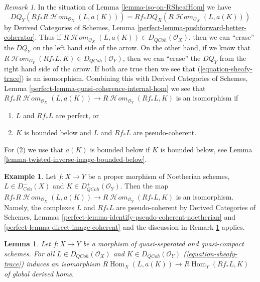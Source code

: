 \documentclass{stacks-project}
\theoremstyle{plain}
\newtheorem{lemma}[subsection]{Lemma}
\theoremstyle{definition}
\newtheorem{example}[subsection]{Example}
\theoremstyle{remark}
\newtheorem{remark}[subsection]{Remark}
\numberwithin{equation}{subsection}
\def\Hom{\mathop{\mathrm{Hom}}\nolimits}
\def\SheafHom{\mathop{\mathcal{H}\!\mathit{om}}\nolimits}
\def\QCoh{\mathit{QCoh}}
\begin{document}
\begin{remark}
\label{remark-iso-on-RSheafHom}
In the situation of Lemma \ref{lemma-iso-on-RSheafHom} we have
$$
DQ_Y(Rf_*R\SheafHom_{\mathcal{O}_X}(L, a(K))) =
Rf_* DQ_X(R\SheafHom_{\mathcal{O}_X}(L, a(K)))
$$
by Derived Categories of Schemes, Lemma
\ref{perfect-lemma-pushforward-better-coherator}.
Thus if $R\SheafHom_{\mathcal{O}_X}(L, a(K)) \in D_\QCoh(\mathcal{O}_X)$,
then we can ``erase'' the $DQ_Y$ on the left hand side of the arrow.
On the other hand, if we know that
$R\SheafHom_{\mathcal{O}_Y}(Rf_*L, K) \in D_\QCoh(\mathcal{O}_Y)$,
then we can ``erase'' the $DQ_Y$ from the right hand side of the arrow.
If both are true then we see that (\ref{equation-sheafy-trace})
is an isomorphism. Combining this with
Derived Categories of Schemes, Lemma
\ref{perfect-lemma-quasi-coherence-internal-hom}
we see that $Rf_*R\SheafHom_{\mathcal{O}_X}(L, a(K)) \to
R\SheafHom_{\mathcal{O}_Y}(Rf_*L, K)$ is an isomorphism if
\begin{enumerate}
\item $L$ and $Rf_*L$ are perfect, or
\item $K$ is bounded below and $L$ and $Rf_*L$ are pseudo-coherent.
\end{enumerate}
For (2) we use that $a(K)$ is bounded below if $K$
is bounded below, see Lemma \ref{lemma-twisted-inverse-image-bounded-below}.
\end{remark}

\begin{example}
\label{example-iso-on-RSheafHom-noetherian}
Let $f : X \to Y$ be a proper morphism of Noetherian schemes,
$L \in D^-_{\textit{Coh}}(X)$ and $K \in D^+_{\QCoh}(\mathcal{O}_Y)$.
Then the map $Rf_*R\SheafHom_{\mathcal{O}_X}(L, a(K)) \to
R\SheafHom_{\mathcal{O}_Y}(Rf_*L, K)$ is an isomorphism.
Namely, the complexes $L$ and $Rf_*L$ are pseudo-coherent by
Derived Categories of Schemes, Lemmas
\ref{perfect-lemma-identify-pseudo-coherent-noetherian} and
\ref{perfect-lemma-direct-image-coherent}
and the discussion in Remark \ref{remark-iso-on-RSheafHom} applies.
\end{example}

\begin{lemma}
\label{lemma-iso-global-hom}
Let $f : X \to Y$ be a morphism of quasi-separated and quasi-compact
schemes.
For all $L \in D_\QCoh(\mathcal{O}_X)$ and $K \in D_\QCoh(\mathcal{O}_Y)$
(\ref{equation-sheafy-trace}) induces an isomorphism
$R\Hom_X(L, a(K)) \to R\Hom_Y(Rf_*L, K)$ of global derived homs.
\end{lemma}
\end{document}
